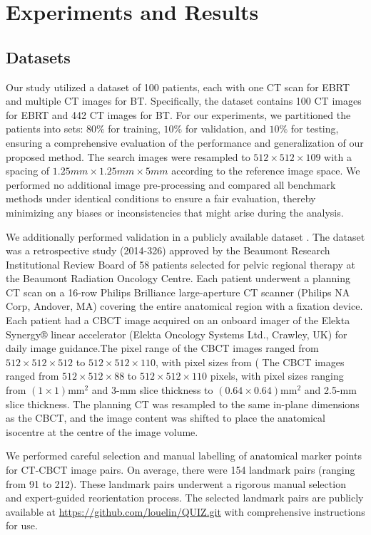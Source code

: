 \documentclass[preprint,review,12pt]{elsarticle}
\begin{document}
\section{Experiments and Results}
\subsection{Datasets}
Our study utilized a dataset of 100 patients, each with one CT scan for EBRT and multiple CT images for BT. Specifically, the dataset contains 100 CT images for EBRT and 442 CT images for BT. For our experiments, we partitioned the patients into sets: $80\%$ for training, $10\%$ for validation, and $10\%$ for testing, ensuring a comprehensive evaluation of the performance and generalization of our proposed method. The search images were resampled to $512\times 512 \times 109$ with a spacing of $1.25mm \times 1.25mm \times 5mm$ according to the reference image space. We performed no additional image pre-processing and compared all benchmark methods under identical conditions to ensure a fair evaluation, thereby minimizing any biases or inconsistencies that might arise during the analysis.

We additionally performed validation in a publicly available dataset \cite{AYorke2021QualityAO}. The dataset was a retrospective study (2014-326) approved by the Beaumont Research Institutional Review Board of 58 patients selected for pelvic regional therapy at the Beaumont Radiation Oncology Centre. Each patient underwent a planning CT scan on a 16-row Philips Brilliance large-aperture CT scanner (Philips NA Corp, Andover, MA) covering the entire anatomical region with a fixation device. Each patient had a CBCT image acquired on an onboard imager of the Elekta Synergy® linear accelerator (Elekta Oncology Systems Ltd., Crawley, UK) for daily image guidance.The pixel range of the CBCT images ranged from $512 \times 512 \times 512$ to $512 \times 512 \times 110$, with pixel sizes from ( The CBCT images ranged from $512 \times 512 \times 88$ to $512 \times 512 \times 110$ pixels, 
with pixel sizes ranging from $(1 \times 1) \text{mm}^2 $ and 3-mm slice thickness to $(0.64 \times 0.64) \text{mm}^2 $ and 2.5-mm slice thickness. The planning CT was resampled to the same in-plane dimensions as the CBCT, and the image content was shifted to place the anatomical isocentre at the centre of the image volume.

We performed careful selection and manual labelling of anatomical marker points for CT-CBCT image pairs. On average, there were 154 landmark pairs (ranging from 91 to 212). These landmark pairs underwent a rigorous manual selection and expert-guided reorientation process. The selected landmark pairs are publicly available at \href{https://github.com/louelin/QUIZ.git}{https://github.com/louelin/QUIZ.git} with comprehensive instructions for use.
\end{document}
